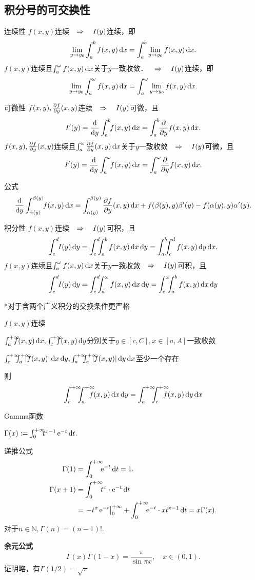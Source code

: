 \subsection{积分号的可交换性}
\begin{theorem}{连续性}{}
	$f(x,y)$连续$\thus I(y)$连续，即
	\[\lim_{y\to y_0}\int_a^bf(x,y)\d x=\int_a^b\lim_{y\to y_0}f(x,y)\d x.\]
	\tcblower
	$f(x,y)$连续且$\int_a^\omega f(x,y)\d x$关于$y$一致收敛．$\thus I(y)$连续，即
	\[\lim_{y\to y_0}\int_a^\omega f(x,y)\d x=\int_a^\omega\lim_{y\to y_0}f(x,y)\d x.\]
\end{theorem}
\begin{theorem}{可微性}{}
	$f(x,y),\pv fy(x,y)$连续$\thus I(y)$可微，且
				\[I'(y)=\frac{\d}{\d y}\int_a^b\bs3f(x,y)\d x=\int_a^b\bs3\pp yf(x,y)\d x.\]
				\tcblower
			$f(x,y),\pv{f}{y}(x,y)$连续且$\int_a^\omega\pv{f}{y}(x,y)\d x$关于$y$一致收敛$\thus I(y)$可微，且
	\[I'(y)=\frac{\d}{\d y}\int_a^\omega\bs3f(x,y)\d x=\int_a^\omega\bs3\pp yf(x,y)\d x.\]
\end{theorem}
公式
\[\dv{}y\int_{\alpha(y)}^{\beta(y)}\bs3f(x,y)\d x=\int_{\alpha(y)}^{\beta(y)}\pv fy(x,y)\d x+f(\beta(y),y)\beta'(y)-f(\alpha(y),y)\alpha'(y).\]
\begin{theorem}{积分性}{}
	$f(x,y)$连续$\thus I(y)$可积，且
	\[\int_c^d\bs3I(y)\d y=\int_c^d\bs5\int_a^b f(x,y)\d x\d y=\int_a^b\bs5\int_c^d f(x,y)\d y\d x.\]
	\tcblower
	$f(x,y)$连续且$\int_a^\omega f(x,y)\d x$关于$y$一致收敛$\thus I(y)$可积，且
	\[\int_c^d\bs3I(y)\d y=\int_c^d\bs5\int_a^\omega f(x,y)\d x\d y=\int_c^\omega\bs5\int_a^b f(x,y)\d x\d y\]
\end{theorem}
*对于含两个广义积分的交换条件更严格
\begin{compactenum}
	\item $f(x,y)$连续
	\item $\int_a^{+\infty}\bs{10}f(x,y)\d x,\int_c^{+\infty}\bs{10}f(x,y)\d y$分别关于$y\in[c,C],x\in[a,A]$一致收敛
	\item $\int_c^{+\infty}\bs7\int_a^{+\infty}\bs{10}|f(x,y)|\d x\d y,\int_a^{+\infty}\bs7\int_c^{+\infty}\bs{10}|f(x,y)|\d y\d x$至少一个存在
\end{compactenum}
则
\[\int_c^{+\infty}\bs7\int_a^{+\infty}\bs{10}f(x,y)\d x\d y=\int_a^{+\infty}\bs7\int_c^{+\infty}\bs{10}f(x,y)\d y\d x\]
\clearpage
\begin{example}{Gamma函数}{}
	\begin{center}
		$\Gamma(x):=\int\zti\bs5t^{x-1}\e{-t}\d t.$
	\end{center}
	递推公式
	\begin{align*}
		\Gamma(1)   & =\int\zti\bs5\e{-t}\d t=1.                                              \\
		\Gamma(x+1) & =\int\zti\bs5 t^x\cdot\e{-t}\d t                                        \\
					& =\edg{-t^x\e{-t}}\zti+\int\zti\bs5\e{-t}\cdot xt^{x-1}\d t=x\Gamma(x).
	\end{align*}
	对于$n\in\mathbb N,\Gamma(n)=(n-1)!.$

	\textbf{余元公式}
	\[\Gamma(x)\Gamma(1-x)=\frac{\pi}{\sin\pi x},\quad x\in(0,1).\]
	证明略，有$\Gamma(1/2)=\sqrt\pi$
\end{example}
